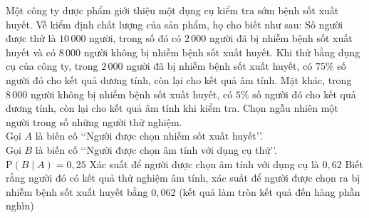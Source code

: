 \begin{ex}%

	Một công ty dược phẩm giới thiệu một dụng cụ kiểm tra sớm bệnh sốt xuất huyết. Về kiểm định chất lượng của sản phẩm, họ cho biết như sau: Số người được thử là $10\,000$ người, trong số đó có $2\,000$ người đã bị nhiễm bệnh sốt xuất huyết và có $8\,000$ người không bị nhiễm bệnh sốt xuất huyết. Khi thử bằng dụng cụ của công ty, trong $2\,000$ người đã bị nhiễm bệnh sốt xuất huyết, có $75\%$ số người đó cho kết quả dương tính, còn lại cho kết quả âm tính. Mặt khác, trong $8\,000$ người không bị nhiễm bệnh sốt xuất huyết, có $5\%$ số người đó cho kết quả dương tính, còn lại cho kết quả âm tính khi kiểm tra. Chọn ngẫu nhiên một người trong số những người thử nghiệm.\\
	Gọi $A$ là biến cố \lq\lq Người được chọn nhiễm sốt xuất huyết\rq\rq.\\
	Gọi $B$ là biến cố \lq\lq Người được chọn âm tính với dụng cụ thử\rq\rq.\\
	{\True $\mathrm{P}(B\mid A)=0{,}25$}
	{Xác suất để người được chọn âm tính với dụng cụ là $0{,}62$}
	{\True Biết rằng người đó có kết quả thử nghiệm âm tính, xác suất để người được chọn ra bị nhiễm bệnh sốt xuất huyết bằng $0{,}062$ (kết quả làm tròn kết quả đến hàng phần nghìn)}
\end{ex}

